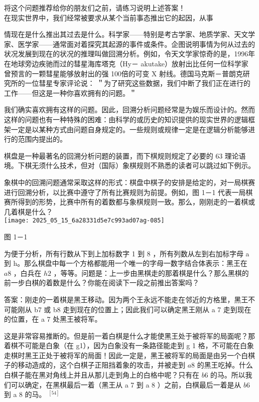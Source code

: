 将这个问题推荐给你的朋友们之前，请练习说明上述答案！\\
在现实世界中，我们经常被要求从某个当前事态推出它的起因，从事

情现在是什么推出其过去是什么。科学家——特别是考古学家、地质学家、天文学家、医学家——通常面对着探究其起源的事件或条件。企图说明事情为何从过去的状况发展到现在的状况的推理叫做回溯分析。例如，令天文学家惊奇的是，1996年在地球旁边疾驰而过的彗星海库塔克（Hy－ akutake）放射出比任何一位科学家曾预言的一颗彗星能够放射出的强 100倍的可变 X 射线。德国马克斯－普朗克研究所的一位彗星专家评论说： ＂为了研究这些数据，我们中断了我们正在进行的工作——但这是一种你喜欢拥有的问题。＂

我们确实喜欢拥有这样的问题。因此，回溯分析问题经常是为娱乐而设计的。然而这样的问题也有一种特殊的困难：由科学的或历史的知识提供的现实世界的逻辑框架一定是以某种方式由问题自身规定的。一些规则或规律一定是在逻辑分析能够进行的范围内提出的。

棋盘是一种最著名的回溯分析问题的装置，而下棋规则规定了必要的 63 理论语境。下棋无须什么技术，但对（国际）象棋规则不熟悉的读者可以跳过如下例示。

象棋中的回溯问题通常采取这样的形式：棋盘中棋子的安排是给定的，对一局棋赛进行回溯分析，以比赛中遵守了所有比赛规则为前提。例如，图 1－1 代表一局棋赛所得到的形势，比赛中所有的着数都与象棋规则一致。那么，刚刚走的一着棋或几着棋是什么？\\
\texttt{[image: 2025\_05\_15\_6a28331d5e7c993ad07ag-085]}

图 1－1

为便于分析，所有行数从下到上加标数字 1 到 8 ，所有列数从左到右加标字母 a 到 h。那么棋盘中每一个方格都能用一个唯一的字母一数字结合体表示：黑王在 $a 8$ ，白兵在 $h 2$ ，等等。问题是：上一步由黑棋走的那着棋是什么？那么黑棋的前一步白棋的着数是什么？你能在阅读下一段之前推出答案吗？

答案：刚走的一着棋是黑王移动。因为两个王永远不能走在邻近的方格里，黑王不可能刚从 b7 或 b8 走到现在的位置上；因此我们可以确定黑王刚从 a 7 走到现在的位置，在 a 7 处黑王被将军。

这是非常容易推断的。但是前一着白棋是什么才能使黑王处于被将军的局面呢？那着棋不可能是白象（在 g1），因为白象没有一条路径能走到 g 1 格，不可能在白象走棋时黑王正处于被将军的局面！因此一定是，黑王被将军的局面是由另一个白棋子的移动造成的，这个白棋子正阻挡着象的攻击，并被走到 $a 8$ 的黑王吃掉。什么白棋子能在黑对角线上并且从那儿走到角上的白格中呢？只有在 $b 6$ 的马。所以我们可以确定，在黑棋最后一着（黑王从 a 7 到 a 8 ）之前，白棋最后一着是从 $b 6$ 到 a 8 的马。 ${ }^{[54]}$

